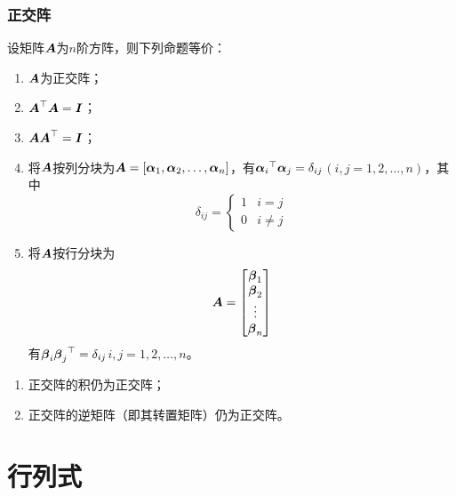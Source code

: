 \documentclass{ctexart}
\begin{document}
\subsubsection*{正交阵}

\begin{theorem}
    设矩阵\(\boldsymbol{A}\)为\(n\)阶方阵，则下列命题等价：
    \begin{enumerate}
        \item \(\boldsymbol{A}\)为正交阵；
        \item \(\boldsymbol{A}^\top\boldsymbol{A}=\boldsymbol{I}\)；
        \item \(\boldsymbol{A}\boldsymbol{A}^\top=\boldsymbol{I}\)；
        \item 将\(\boldsymbol{A}\)按列分块为\(\boldsymbol{A}=\left[ {\boldsymbol{\alpha}}_1,{\boldsymbol{\alpha}}_2,\dots,{\boldsymbol{\alpha}}_{n} \right]\)，有\({\boldsymbol{\alpha}_i}^\top\boldsymbol{\alpha}_j=\delta_{ij}\)\((i,j=1,2,\dots,n)\)，其中\begin{equation*}
                  \delta_{ij}=\begin{cases}
                      1 & i=j \\0&i\neq j
                  \end{cases}
              \end{equation*}
        \item 将\(\boldsymbol{A}\)按行分块为\begin{equation*}
                  \boldsymbol{A}=\begin{bmatrix}
                      \boldsymbol{\beta}_1 \\\boldsymbol{\beta}_2\\\vdots\\\boldsymbol{\beta}_n
                  \end{bmatrix}
              \end{equation*}有\(\boldsymbol{\beta}_i{\boldsymbol{\beta}_j}^\top=\delta_{ij}\)\(i,j=1,2,\dots,n\)。
    \end{enumerate}
\end{theorem}

\begin{property}
    \begin{enumerate}
        \item 正交阵的积仍为正交阵；
        \item 正交阵的逆矩阵（即其转置矩阵）仍为正交阵。
    \end{enumerate}
\end{property}

\clearpage

\section{行列式}
\end{document}
